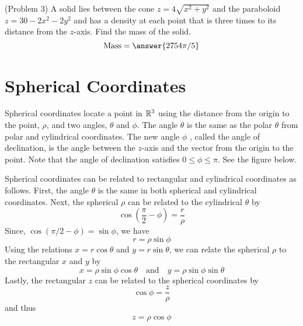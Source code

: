 \documentclass[handout]{ximera}
\begin{document}
\begin{problem}(Problem 3)
A solid lies between the cone $z = 4\sqrt{x^2 + y^2}$ and the paraboloid $z = 30 - 2x^2 - 2y^2$ and has a 
density at each point that is three times to its distance from the $z$-axis. Find the mass of the solid.\\
\[
\text{Mass} = \answer{2754\pi/5 }
\]
\end{problem}

\section{Spherical Coordinates}
Spherical coordinates locate a point in $\mathbb R^3$ using the distance from the origin to the point, $\rho$,  
and two angles, $\theta$ and $\phi$. The angle $\theta$ is the same as the polar $\theta$ from polar and cylindrical coordinates.
The new angle $\phi$ , called the angle of declination, is the angle between the $z$-axis and the vector from the origin to the point.
Note that the angle of declination satisfies $0 \leq \phi \leq \pi$.
See the figure below.
\begin{image}
\end{image}

Spherical coordinates can be related to rectangular and cylindrical coordinates as follows. First, the angle $\theta$ is the same in 
both spherical and cylindrical coordinates. Next, the spherical $\rho$ can be related to the cylindrical $\theta$ by
\[
\cos\left(\frac{\pi}{2} - \phi\right) = \frac{r}{\rho}
\]
Since, $\cos(\pi/2 - \phi) = \sin \phi$, we have
\[
r = \rho \sin \phi
\]
Using the relations $x = r\cos \theta$ and $y = r\sin \theta$, we can relate the spherical $\rho$ to the rectangular $x$ and $y$ by
\[
x = \rho \sin \phi \cos \theta \quad \text{and} \quad y = \rho \sin \phi \sin \theta
\]
Lastly, the rectangular $z$ can be related to the spherical coordinates by
\[
\cos \phi = \frac{z}{\rho}
\]
and thus
\[
z = \rho \cos \phi
\]
\end{document}
